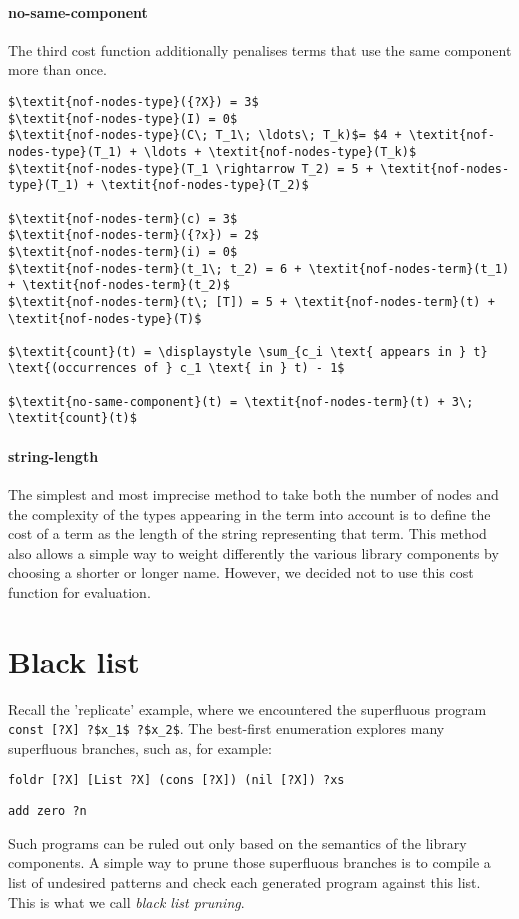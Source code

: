   \paragraph{no-same-component}
The third cost function additionally penalises terms that use the same component more than once.
%
\begin{lstlisting}[style=algorithm]
$\textit{nof-nodes-type}({?X}) = 3$
$\textit{nof-nodes-type}(I) = 0$
$\textit{nof-nodes-type}(C\; T_1\; \ldots\; T_k)$= $4 + \textit{nof-nodes-type}(T_1) + \ldots + \textit{nof-nodes-type}(T_k)$
$\textit{nof-nodes-type}(T_1 \rightarrow T_2) = 5 + \textit{nof-nodes-type}(T_1) + \textit{nof-nodes-type}(T_2)$

$\textit{nof-nodes-term}(c) = 3$
$\textit{nof-nodes-term}({?x}) = 2$
$\textit{nof-nodes-term}(i) = 0$
$\textit{nof-nodes-term}(t_1\; t_2) = 6 + \textit{nof-nodes-term}(t_1) + \textit{nof-nodes-term}(t_2)$
$\textit{nof-nodes-term}(t\; [T]) = 5 + \textit{nof-nodes-term}(t) + \textit{nof-nodes-type}(T)$

$\textit{count}(t) = \displaystyle \sum_{c_i \text{ appears in } t} \text{(occurrences of } c_1 \text{ in } t) - 1$

$\textit{no-same-component}(t) = \textit{nof-nodes-term}(t) + 3\; \textit{count}(t)$
\end{lstlisting}

  \paragraph{string-length}
The simplest and most imprecise method to take both the number of nodes and the complexity of the types appearing in the term into account is to define the cost of a term as the length of the string representing that term. This method also allows a simple way to weight differently the various library components by choosing a shorter or longer name. However, we decided not to use this cost function for evaluation.

\section{Black list}\label{Black list}
Recall the 'replicate' example, where we encountered the superfluous program \lstinline!const [?X] ?$x_1$ ?$x_2$!. The best-first enumeration explores many superfluous branches, such as, for example:
\begin{lstlisting}[style=plain]
foldr [?X] [List ?X] (cons [?X]) (nil [?X]) ?xs
\end{lstlisting}
\begin{lstlisting}[style=plain]
add zero ?n
\end{lstlisting}
Such programs can be ruled out only based on the semantics of the library components. A simple way to prune those superfluous branches is to compile a list of undesired patterns and check each generated program against this list. This is what we call \emph{black list pruning}.

